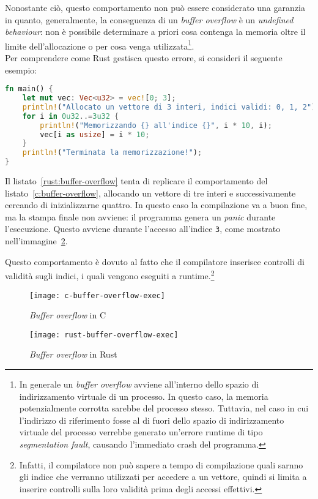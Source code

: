 Nonostante ciò, questo comportamento non può essere considerato una garanzia in quanto, generalmente, la conseguenza di un \textit{buffer overflow} è un \textit{undefined behaviour}: 
non è possibile determinare a priori cosa contenga la memoria oltre
il limite dell'allocazione o per cosa venga utilizzata\footnote{In generale un \textit{buffer overflow} avviene all'interno dello spazio
di indirizzamento virtuale di un processo. In questo caso, la memoria potenzialmente corrotta sarebbe
 del processo stesso. Tuttavia, nel caso in cui l'indirizzo di riferimento
 fosse al di fuori dello spazio di indirizzamento virtuale del processo verrebbe generato un'errore runtime di tipo \textit{segmentation fault}, 
 causando l'immediato crash del programma.}. \hfill
\vspace{10pt}\\
\noindent Per comprendere come Rust gestisca questo errore, si consideri il seguente esempio:
\begin{lstlisting}[language=Rust, caption={Buffer overflow in Rust}, label={rust:buffer-overflow}]
fn main() {
    let mut vec: Vec<u32> = vec![0; 3];
    println!("Allocato un vettore di 3 interi, indici validi: 0, 1, 2");
    for i in 0u32..=3u32 {    
        println!("Memorizzando {} all'indice {}", i * 10, i);
        vec[i as usize] = i * 10;
    }
    println!("Terminata la memorizzazione!");
}
\end{lstlisting}
Il listato~\ref{rust:buffer-overflow} tenta di replicare il comportamento del listato~\ref{c:buffer-overflow}, 
allocando un vettore di tre interi e successivamente cercando di inizializzarne quattro. 
In questo caso la compilazione va a buon fine, ma la stampa finale non avviene: il programma genera un \textit{panic} durante l'esecuzione. Questo avviene
durante l'accesso all'indice \texttt{3}, come mostrato nell'immagine~\ref{rust:buffer-overflow-exec}.

Questo comportamento è dovuto al fatto che il compilatore inserisce controlli di validità sugli indici, i quali vengono eseguiti a runtime.\footnote{Infatti, il compilatore non può sapere a tempo di compilazione quali sarnno gli indice che verranno utilizzati per accedere a un vettore, quindi si limita a inserire controlli sulla loro validità prima degli accessi effettivi.}
\begin{figure}[htbp]
\begin{center}
    \texttt{[image: c-buffer-overflow-exec]}
    \caption{\textit{Buffer overflow} in C}\label{c:buffer-overflow-exec}
    \end{center}
\end{figure}
\begin{figure}[htbp]
\begin{center}
    \texttt{[image: rust-buffer-overflow-exec]}
    \caption{\textit{Buffer overflow} in Rust}\label{rust:buffer-overflow-exec}
    \end{center}
\end{figure}


